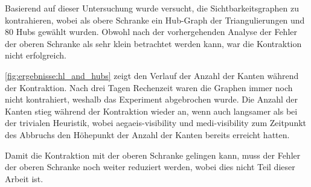 Basierend auf dieser Untersuchung wurde versucht, die Sichtbarkeitsgraphen zu kontrahieren, wobei als obere Schranke ein Hub-Graph der Triangulierungen und 80 Hubs gewählt wurden.
Obwohl nach der vorhergehenden Analyse der Fehler der oberen Schranke als sehr klein betrachtet werden kann, war die Kontraktion nicht erfolgreich.

\autoref{fig:ergebnisse:hl_and_hubs} zeigt den Verlauf der Anzahl der Kanten während der Kontraktion.
Nach drei Tagen Rechenzeit waren die Graphen immer noch nicht kontrahiert, weshalb das Experiment abgebrochen wurde.
Die Anzahl der Kanten stieg während der Kontraktion wieder an, wenn auch langsamer als bei der trivialen Heuristik, wobei aegaeis-visibility und medi-visibility zum Zeitpunkt des Abbruchs den Höhepunkt der Anzahl der Kanten bereits erreicht hatten.

Damit die Kontraktion mit der oberen Schranke gelingen kann, muss der Fehler der oberen Schranke noch weiter reduziert werden, wobei dies nicht Teil dieser Arbeit ist.

